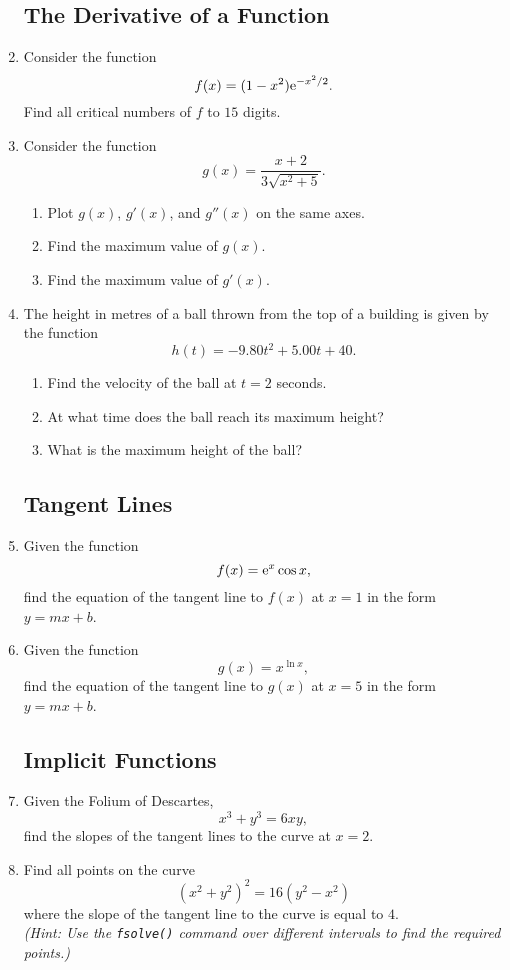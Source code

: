 \begin{enumerate}
\subsection{The Derivative of a Function}

\item Consider the function \[ f(x) = (1-x^2) {\rm e}^{-x^2/2}. \] Find all critical numbers of $f$ to $15$ digits.
\item Consider the function \[ g(x) = \frac{x+2}{3\sqrt{x^2+5}}. \]
	\begin{enumerate}
	\item Plot $g(x)$, $g'(x)$, and $g''(x)$ on the same axes.
	\item Find the maximum value of $g(x)$.
	\item Find the maximum value of $g'(x)$.
	\end{enumerate}
\item The height in metres of a ball thrown from the top of a building is given by the function
\[ h(t) = -9.80t^2 + 5.00t + 40. \]
	\begin{enumerate}
	\item Find the velocity of the ball at $t=2$ seconds.
	\item At what time does the ball reach its maximum height?
	\item What is the maximum height of the ball?
	\end{enumerate}

\subsection{Tangent Lines}

\item Given the function \[ f(x) = {\rm e}^x \cos x, \] find the equation of the tangent line to $f(x)$ at $x=1$ in the form $y = mx + b$.
\item Given the function \[ g(x) = x^{\ln x}, \] find the equation of the tangent line to $g(x)$ at $x=5$ in the form $y = mx + b$.

\subsection{Implicit Functions}

\item Given the Folium of Descartes,
\[ x^3 + y^3 = 6xy, \]
find the slopes of the tangent lines to the curve at $x=2$.
\item Find all points on the curve
\[ (x^2+y^2)^2 = 16(y^2-x^2) \]
where the slope of the tangent line to the curve is equal to $4$.\\
\textit{(Hint: Use the \texttt{fsolve()} command over different intervals to find the required points.)}
\end{enumerate}

